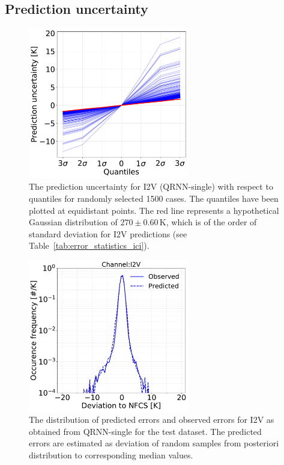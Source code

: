 \documentclass[amt]{copernicus}
\begin{document}
\subsection{Prediction uncertainty}
\label{sec:prediction_uncertainty}
\begin{figure}[t]
	\includegraphics[width = 70mm]{Figures/prediction_uncertainty_I2V.pdf}	
	\caption{The prediction uncertainty for I2V (QRNN-single) with respect to quantiles for randomly selected 1500 cases. The quantiles have been plotted at equidistant points. The red line represents a hypothetical Gaussian distribution of $270\pm0.60$\,K, which is of the order of standard deviation for I2V predictions (see Table~\ref{tab:error_statistics_ici}).}
	\label{fig:prediction_uncertainty_I2V}	
\end{figure}
\begin{figure}[t]
	\includegraphics[width=70mm]{Figures/deviation_posterior_samples_I2V.pdf}	
	\caption{The distribution of predicted errors and observed errors for I2V as obtained from QRNN-single for the test dataset. The predicted errors are estimated as deviation of random samples from posteriori distribution to corresponding median values.}
	\label{fig:predicted_errors}	
\end{figure}
\end{document}
